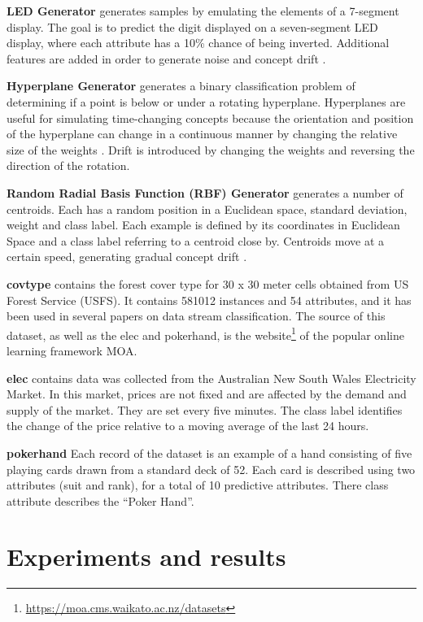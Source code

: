 \documentclass{sig-alternate-br}
\begin{document}
\textbf{LED Generator} generates samples by emulating the elements of a 7-segment display. The goal is to predict the digit displayed on a seven-segment LED display, where each attribute has a 10\% chance of being inverted. Additional features are added in order to generate noise and concept drift \cite{breiman1984classification}.

\textbf{Hyperplane Generator} generates a binary classification problem of determining if a point is below or under a rotating hyperplane. Hyperplanes are useful for simulating time-changing concepts because the orientation and position of the hyperplane can change in a continuous manner by changing the relative size of the weights \cite{hulten2001mining}. Drift is introduced by changing the weights and reversing the direction of the rotation.
    
\textbf{Random Radial Basis Function (RBF) Generator} generates a number of centroids. Each has a random position in a Euclidean space, standard deviation, weight and class label. Each example is defined by its coordinates in Euclidean Space and a class label referring to a centroid close by.  Centroids move at a certain speed, generating gradual concept drift \cite{van2016massively}.

\textbf{covtype} contains the forest cover type for 30 x 30 meter cells obtained from US Forest Service (USFS). It contains 581012 instances and 54 attributes, and it has been used in several papers on data stream classification. The source of this dataset, as well as the elec and pokerhand, is the website\footnote{\url{https://moa.cms.waikato.ac.nz/datasets}} of the popular online learning framework MOA.

\textbf{elec} contains data was collected from the Australian New South Wales Electricity Market. In this market, prices are not fixed and are affected by the demand and supply of the market. They are set every five minutes. The class label identifies the change of the price relative to a moving average of the last 24 hours.

\textbf{pokerhand} Each record of the dataset is an example of a hand consisting of five playing cards drawn from a standard deck of 52. Each card is described using two attributes (suit and rank), for a total of 10 predictive attributes. There class attribute describes the “Poker Hand”.

\section{Experiments and results}
\label{experiments}
\end{document}
